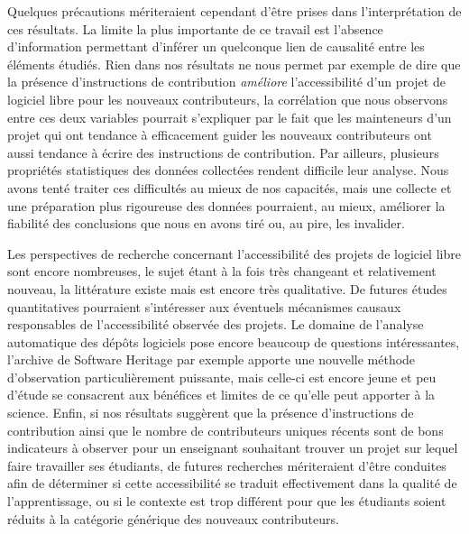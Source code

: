 \documentclass[dvipsnames,runningheads]{llncs}
\begin{document}
    Quelques précautions mériteraient cependant d'être prises dans l'interprétation de ces résultats. La
    limite la plus importante de ce travail est l'absence d'information permettant d'inférer un quelconque
    lien de causalité entre les éléments étudiés. Rien dans nos résultats ne nous permet par exemple de dire
    que la présence d'instructions de contribution \emph{améliore} l'accessibilité d'un projet de logiciel
    libre pour les nouveaux contributeurs, la corrélation que nous observons entre ces deux variables pourrait
    s'expliquer par le fait que les mainteneurs d'un projet qui ont tendance à efficacement guider les
    nouveaux contributeurs ont aussi tendance à écrire des instructions de contribution. Par ailleurs,
    plusieurs propriétés statistiques des données collectées rendent difficile leur analyse. Nous avons tenté
    traiter ces difficultés au mieux de nos capacités, mais une collecte et une préparation plus rigoureuse
    des données pourraient, au mieux, améliorer la fiabilité des conclusions que nous en avons tiré ou, au
    pire, les invalider.

    Les perspectives de recherche concernant l'accessibilité des projets de logiciel libre sont encore
    nombreuses, le sujet étant à la fois très changeant et relativement nouveau, la littérature existe mais
    est encore très qualitative. De futures études quantitatives pourraient s'intéresser aux éventuels
    mécanismes causaux responsables de l'accessibilité observée des projets. Le domaine de l'analyse
    automatique des dépôts logiciels pose encore beaucoup de questions intéressantes, l'archive de Software
    Heritage par exemple apporte une nouvelle méthode d'observation particulièrement puissante, mais celle-ci
    est encore jeune et peu d'étude se consacrent aux bénéfices et limites de ce qu'elle peut apporter à la
    science. Enfin, si nos résultats suggèrent que la présence d'instructions de contribution ainsi que le
    nombre de contributeurs uniques récents sont de bons indicateurs à observer pour un enseignant souhaitant
    trouver un projet sur lequel faire travailler ses étudiants, de futures recherches mériteraient d'être
    conduites afin de déterminer si cette accessibilité se traduit effectivement dans la qualité de
    l'apprentissage, ou si le contexte est trop différent pour que les étudiants soient réduits à la catégorie
    générique des nouveaux contributeurs.

    \printbibliography[heading=bibintoc]
\end{document}
